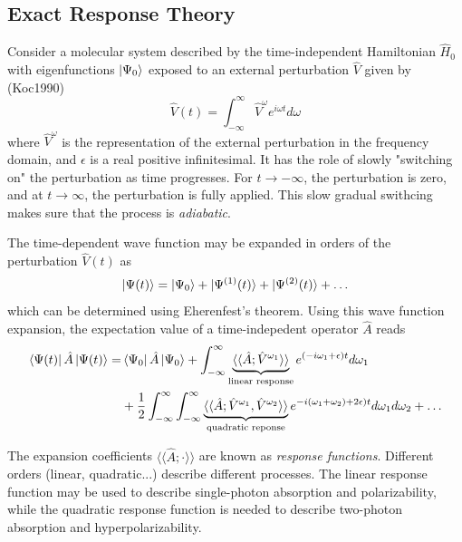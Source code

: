 \subsection{Exact Response Theory}

Consider a molecular system described by the time-independent Hamiltonian $\hat{H}_0$ with eigenfunctions $\ket{\Psi_0}$ exposed to
an external perturbation $\hat{V}$ given by (Koc1990)
\begin{equation}
\hat{V}(t) = \int_{-\infty}^{\infty} \hat{V}^{\omega} e^{i\omega t  } d\omega
\end{equation}
\noindent where $\hat{V}^{\omega}$ is the representation of the external perturbation in the frequency domain, and $\epsilon$ is a real positive infinitesimal. It has the role of slowly "switching on" the perturbation as time progresses. For $t\rightarrow -\infty$, the perturbation is zero, and at $t \rightarrow \infty$, the perturbation is fully applied. This slow gradual swithcing makes sure that the process is \emph{adiabatic}.

The time-dependent wave function may be expanded in orders of the perturbation $\hat{V}(t)$ as
\begin{equation}
\ket{\smash{\Psi (t)}} = \ket{\smash{\Psi_0}} + \ket{\smash{\Psi^{(1)}(t)}} + \ket{\smash{\Psi^{(2)}(t)}} + \ldots
\end{equation}
\noindent which can be determined using Eherenfest's theorem. Using this wave function expansion, the expectation value of a time-indepedent operator $\hat{A}$ reads
\begin{equation}
\begin{split}
\bra{\smash{\Psi (t)}} \hat{A} \ket{\smash{\Psi (t)}} = & \bra{\smash{\Psi_0}} \hat{A} \ket{\smash{\Psi_0}} + \int_{-\infty}^{\infty} 
\underbrace{ \langle\langle \hat{A}; \hat{V}^{\omega_1}
\rangle\rangle}_{\text{linear response}} 
e^{(-i\omega_1 + \epsilon)t} d\omega_1 \\
&+ \frac{1}{2} \int_{-\infty}^{\infty} \int_{-\infty}^{\infty}
\underbrace{ \langle\langle \hat{A}; \hat{V}^{\omega_1},\hat{V}^{\omega_2} \rangle\rangle 
}_{\text{quadratic reponse}}
e^{-i(\omega_1+\omega_2) + 2\epsilon)t} d\omega_1 d\omega_2  + \ldots
\end{split}
\label{eq:TIMEEXP}
\end{equation}

\noindent The expansion coefficients $\langle\langle \hat{A}; \cdot \rangle\rangle$ are known as \emph{response functions}. Different orders (linear, quadratic...) describe different processes. The linear response function may be used to describe single-photon absorption and polarizability, while the quadratic response function is needed to describe two-photon absorption and hyperpolarizability. 

